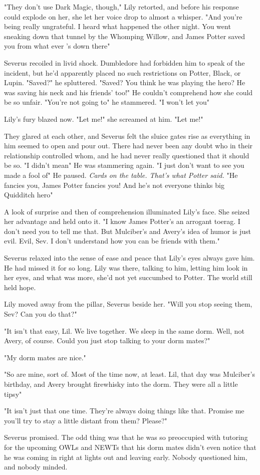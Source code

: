 "They don't use Dark Magic, though," Lily retorted, and before his response could explode on her, she let her voice drop to almost a whisper. "And you're being really ungrateful. I heard what happened the other night. You went sneaking down that tunnel by the Whomping Willow, and James Potter saved you from what ever 's down there{\el}"

Severus recoiled in livid shock. Dumbledore had forbidden him to speak of the incident, but he'd apparently placed no such restrictions on Potter, Black, or Lupin. "Saved?" he spluttered. "Saved? You think he was playing the hero? He was saving his neck and his friends' too!" He couldn't comprehend how she could be so unfair. "You're not going to{\el}" he stammered. "I won't let you{\el}"

Lily's fury blazed now. "Let me!" she screamed at him. "Let me!"

They glared at each other, and Severus felt the sluice gates rise as everything in him seemed to open and pour out. There had never been any doubt who in their relationship controlled whom, and he had never really questioned that it should be so. "I didn't mean{\el}" He was stammering again. "I just don't want to{\el} see you made a fool of{\el}" He paused. \emph{Cards on the table. That's what Potter said.} "He fancies you, James Potter fancies you! And he's not{\el} everyone thinks{\el} big Quidditch hero{\el}"

A look of surprise and then of comprehension illuminated Lily's face. She seized her advantage and held onto it. "I know James Potter's an arrogant toerag. I don't need you to tell me that. But Mulciber's and Avery's idea of humor is just evil. Evil, Sev. I don't understand how you can be friends with them."

Severus relaxed into the sense of ease and peace that Lily's eyes always gave him. He had missed it for so long. Lily was there, talking to him, letting him look in her eyes, and what was more, she'd not yet succumbed to Potter. The world still held hope.

Lily moved away from the pillar, Severus beside her. "Will you stop seeing them, Sev? Can you do that?"

"It isn't that easy, Lil. We live together. We sleep in the same dorm. Well, not Avery, of course. Could you just stop talking to your dorm mates?"

"My dorm mates are nice."

"So are mine, sort of. Most of the time now, at least. Lil, that day was Mulciber's birthday, and Avery brought firewhisky into the dorm. They were all a little tipsy{\el}"

"It isn't just that one time. They're always doing things like that. Promise me you'll try to stay a little distant from them? Please?"

Severus promised. The odd thing was that he was so preoccupied with tutoring for the upcoming OWLs and NEWTs that his dorm mates didn't even notice that he was coming in right at lights out and leaving early. Nobody questioned him, and nobody minded. 


